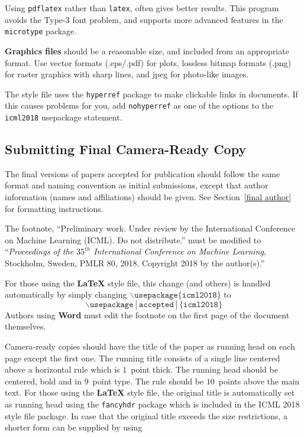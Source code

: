 \documentclass{article}
\begin{document}
Using \texttt{pdflatex} rather than \texttt{latex}, often gives better
results. This program avoids the Type-3 font problem, and supports more
advanced features in the \texttt{microtype} package.

\textbf{Graphics files} should be a reasonable size, and included from
an appropriate format. Use vector formats (.eps/.pdf) for plots,
lossless bitmap formats (.png) for raster graphics with sharp lines, and
jpeg for photo-like images.

The style file uses the \texttt{hyperref} package to make clickable
links in documents. If this causes problems for you, add
\texttt{nohyperref} as one of the options to the \texttt{icml2018}
usepackage statement.


\subsection{Submitting Final Camera-Ready Copy}

The final versions of papers accepted for publication should follow the
same format and naming convention as initial submissions, except that
author information (names and affiliations) should be given. See
Section~\ref{final author} for formatting instructions.

The footnote, ``Preliminary work. Under review by the International
Conference on Machine Learning (ICML). Do not distribute.'' must be
modified to ``\textit{Proceedings of the
$\mathit{35}^{th}$ International Conference on Machine Learning},
Stockholm, Sweden, PMLR 80, 2018.
Copyright 2018 by the author(s).''

For those using the \textbf{\LaTeX} style file, this change (and others) is
handled automatically by simply changing
$\mathtt{\backslash usepackage\{icml2018\}}$ to
$$\mathtt{\backslash usepackage[accepted]\{icml2018\}}$$
Authors using \textbf{Word} must edit the
footnote on the first page of the document themselves.

Camera-ready copies should have the title of the paper as running head
on each page except the first one. The running title consists of a
single line centered above a horizontal rule which is $1$~point thick.
The running head should be centered, bold and in $9$~point type. The
rule should be $10$~points above the main text. For those using the
\textbf{\LaTeX} style file, the original title is automatically set as running
head using the \texttt{fancyhdr} package which is included in the ICML
2018 style file package. In case that the original title exceeds the
size restrictions, a shorter form can be supplied by using
\end{document}
